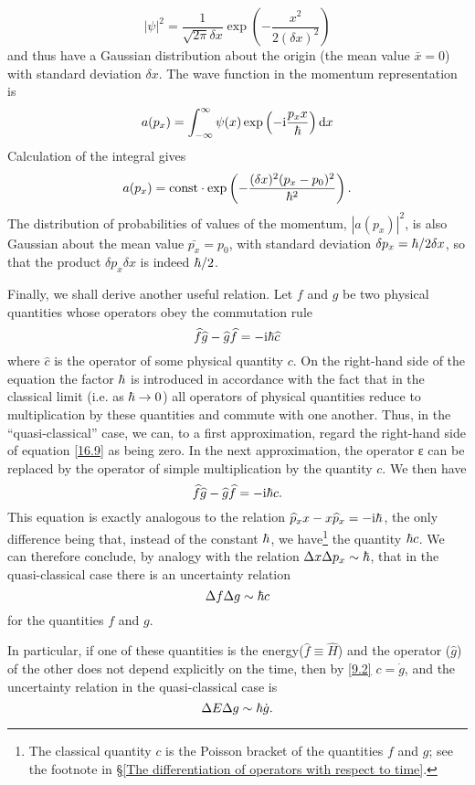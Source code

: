 \[ |\psi|^2=\frac{1}{\sqrt{2\pi}\delta x}\exp\left(-\frac{x^2}{2(\delta x)^2}\right) \]
and thus have a Gaussian distribution about the origin (the mean value $ \bar{x}=0 $) with standard deviation $ \delta x $. The wave function in the momentum representation is
\[ a(p_x)=\int_{-\infty}^{\infty}\psi(x)\exp\left(-\mathrm{i}\frac{p_x x}{\hbar} \right)\mathrm{d} x \]
Calculation of the integral gives
\[ a(p_x)=\mathrm{const}\cdot\exp\left( -\frac{(\delta x)^2(p_x-p_0)^2}{\hbar^2} \right). \]
The distribution of probabilities of values of the momentum, $ |a(p_x)|^2 $, is also Gaussian about the mean value $ \bar{p_x}=p_0 $, with standard deviation $ \delta p_x = \hbar/2\delta x $, so that the product $ \delta p_x\delta x $ is indeed $ \hbar/2 $.

Finally, we shall derive another useful relation. Let $ f $ and $ g $ be two physical quantities whose operators obey the commutation rule
\begin{equation}\label{16.9}
\widehat{f}\widehat{g}-\widehat{g}\widehat{f}=-\mathrm{i}\hbar\widehat{c}
\end{equation}
where $\hat{c}$ is the operator of some physical quantity $ c $. On the right-hand side of the equation the factor $ \hbar $ is introduced in accordance with the fact that in the classical limit (i.e. as $ \hbar \rightarrow 0 $) all operators of physical quantities reduce to multiplication by these quantities and commute with one another. Thus, in the “quasi-classical” case, we can, to a first approximation, regard the right-hand side of equation \eqref{16.9} as being zero. In the next approximation, the operator ε can be replaced by the operator of simple multiplication by the quantity $ c $. We then have
\[ \widehat{f}\widehat{g}-\widehat{g}\widehat{f}=-\mathrm{i}\hbar c. \]
This equation is exactly analogous to the relation $ \widehat{p}_xx-x\widehat{p}_x=-\mathrm{i}\hbar $, the only difference being that, instead of the constant $ \hbar $, we have\footnote{The classical quantity $ c $ is the Poisson bracket of the quantities $ f $ and $ g $; see the footnote in \S\ref{The differentiation of operators with respect to time}.} the quantity $ \hbar c $. We can therefore conclude, by analogy with the relation $ \Delta x\Delta p_x \sim \hbar $, that in the quasi-classical case there is an uncertainty relation
\begin{equation}\label{16.10}
\Delta f\Delta g\sim\hbar c
\end{equation}
for the quantities $ f $ and $ g $.

In particular, if one of these quantities is the energy($ \hat{f}\equiv\hat{H} $) and the operator ($ \hat{g} $) of the other does not depend explicitly on the time, then by \ref{9.2} $ c = \dot{g} $, and the uncertainty relation in the quasi-classical case is
\begin{equation}\label{16.11}
\Delta E\Delta g\sim\hbar\dot{g}.
\end{equation}